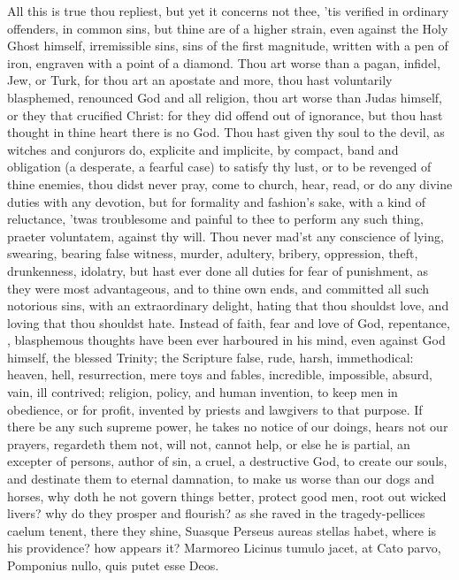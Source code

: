 {All this is true thou repliest, but yet it concerns not thee, 'tis
verified in ordinary offenders, in common sins, but thine are of a
higher strain, even against the Holy Ghost himself, irremissible sins,
sins of the first magnitude, written with a pen of iron, engraven with
a point of a diamond. Thou art worse than a pagan, infidel, Jew, or
Turk, for thou art an apostate and more, thou hast voluntarily
blasphemed, renounced God and all religion, thou art worse than Judas
himself, or they that crucified Christ: for they did offend out of
ignorance, but thou hast thought in thine heart there is no God. Thou
hast given thy soul to the devil, as witches and conjurors do,
explicite and implicite, by compact, band and obligation (a desperate,
a fearful case) to satisfy thy lust, or to be revenged of thine
enemies, thou didst never pray, come to church, hear, read, or do any
divine duties with any devotion, but for formality and fashion's sake,
with a kind of reluctance, 'twas troublesome and painful to thee to
perform any such thing, praeter voluntatem, against thy will. Thou
never mad'st any conscience of lying, swearing, bearing false witness,
murder, adultery, bribery, oppression, theft, drunkenness, idolatry,
but hast ever done all duties for fear of punishment, as they were most
advantageous, and to thine own ends, and committed all such notorious
sins, with an extraordinary delight, hating that thou shouldst love,
and loving that thou shouldst hate. Instead of faith, fear and love of
God, repentance, \etc{}, blasphemous thoughts have been ever harboured in
his mind, even against God himself, the blessed Trinity; the
Scripture false, rude, harsh, immethodical: heaven, hell,
resurrection, mere toys and fables, incredible, impossible,
absurd, vain, ill contrived; religion, policy, and human invention, to
keep men in obedience, or for profit, invented by priests and lawgivers
to that purpose. If there be any such supreme power, he takes no notice
of our doings, hears not our prayers, regardeth them not, will not,
cannot help, or else he is partial, an excepter of persons, author of
sin, a cruel, a destructive God, to create our souls, and destinate
them to eternal damnation, to make us worse than our dogs and horses,
why doth he not govern things better, protect good men, root out wicked
livers? why do they prosper and flourish? as she raved in the
tragedy-pellices caelum tenent, there they shine, Suasque Perseus
aureas stellas habet, where is his providence? how appears it?
Marmoreo Licinus tumulo jacet, at Cato parvo,
Pomponius nullo, quis putet esse Deos.

}
